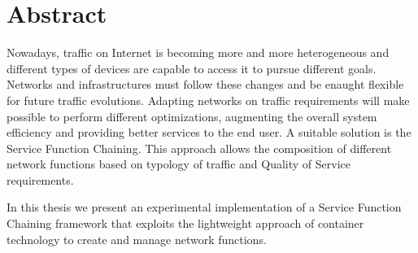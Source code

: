 \cleardoublepage
{}

\vspace*{\fill}

\vspace*{-5cm}

\section*{Abstract}
\thispagestyle{empty}

Nowadays, traffic on Internet is becoming more and more heterogeneous and
different types of devices are capable to access it to pursue different goals.
Networks and infrastructures must follow these changes and be enaught flexible
for future traffic evolutions. Adapting networks on traffic requirements will
make possible to perform different optimizations, augmenting the overall system
efficiency and providing better services to the end user. A suitable solution is
the Service Function Chaining. This approach allows the composition of different
network functions based on typology of traffic and Quality of Service
requirements. 

In this thesis we present an experimental implementation of a Service Function
Chaining framework that exploits the lightweight approach of container
technology to create and manage network functions.

\vspace*{\fill}